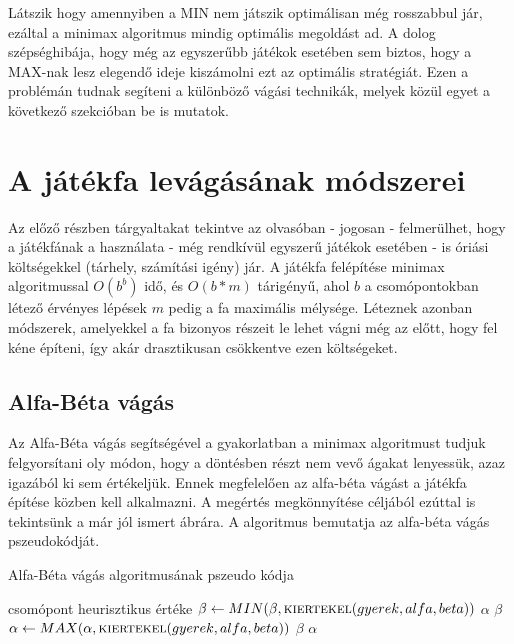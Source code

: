Látszik hogy amennyiben a MIN nem játszik optimálisan még rosszabbul jár, ezáltal a minimax algoritmus mindig optimális megoldást ad. A dolog szépséghibája, hogy még az egyszerűbb játékok esetében sem biztos, hogy a MAX-nak lesz elegendő ideje kiszámolni ezt az optimális stratégiát. Ezen a problémán tudnak segíteni a különböző vágási technikák, melyek közül egyet a következő szekcióban be is mutatok.


\section{A játékfa levágásának módszerei}
Az előző részben tárgyaltakat tekintve az olvasóban - jogosan - felmerülhet, hogy a játékfának a használata - még rendkívül egyszerű játékok esetében - is óriási költségekkel (tárhely, számítási igény) jár. A játékfa felépítése minimax algoritmussal $O(b^b)$ idő, és $O(b*m)$ tárigényű, ahol $b$ a csomópontokban létező érvényes lépések $m$ pedig a fa maximális mélysége. Léteznek azonban módszerek, amelyekkel a fa bizonyos részeit le lehet vágni még az előtt, hogy fel kéne építeni, így akár drasztikusan csökkentve ezen költségeket.

\subsection{Alfa-Béta vágás}
Az Alfa-Béta vágás segítségével a gyakorlatban a minimax algoritmust tudjuk felgyorsítani oly módon, hogy a döntésben részt nem vevő ágakat lenyessük, azaz igazából ki sem értékeljük. Ennek megfelelően az alfa-béta vágást a játékfa építése közben kell alkalmazni. A megértés megkönnyítése céljából ezúttal is tekintsünk a már jól ismert  ábrára. A  algoritmus bemutatja az alfa-béta vágás pszeudokódját.\ujsor

\begin{algorithm}
	\caption{Alfa-Béta vágás algoritmusának pszeudo kódja}
	\label{alg:alfabeta}
	\begin{algorithmic}[1]
		\State \Return csomópont heurisztikus értéke
		\EndIf
		\State $\beta \gets MIN(\beta, \Call{kiertekel}{gyerek, alfa, beta})$
		\If {$\beta <= \alpha$}
		\State \Return $\alpha$
		\EndIf
		\EndFor
		\State \Return $\beta$
		\EndIf		
		\State $\alpha \gets MAX(\alpha, \Call{kiertekel}{gyerek, alfa, beta})$
		\If {$\beta <= \alpha$}
		\State \Return $\beta$
		\EndIf
		\EndFor
		\State \Return $\alpha$
		\EndIf	
		\EndFunction
	\end{algorithmic}
\end{algorithm}


